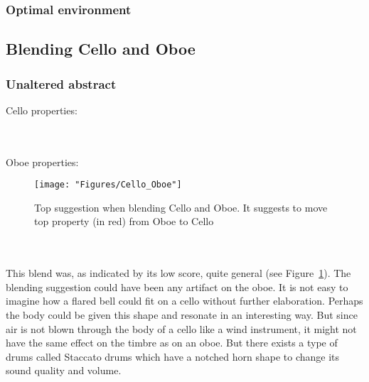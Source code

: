 \noindent{}


\subsubsection{Optimal environment}
\noindent\fbox{ \parbox{\textwidth}{
		
		
} }
\noindent\fbox{ \parbox{\textwidth}{
			
			
} }
		

\subsection{Blending Cello and Oboe}

\subsubsection{Unaltered abstract}

Cello properties:

\noindent{}
\\\\Oboe properties:

\begin{figure} \centering \texttt{[image: "Figures/Cello\_Oboe"]} \caption{Top suggestion when blending Cello and Oboe. It suggests to move top property (in red) from Oboe to Cello } \label{Cello-Oboe} \end{figure}

\noindent{}	
\\\\This blend was, as indicated by its low score, quite general (see Figure~\ref{Cello-Oboe}). The blending suggestion could have been any artifact on the oboe. It is not easy to imagine how a flared bell could fit on a cello without further elaboration. Perhaps the body could be given this shape and resonate in an interesting way. But since air is not blown through the body of a cello like a wind instrument, it might not have the same effect on the timbre as on an oboe. But there exists a type of drums called Staccato drums which have a notched horn shape to change its sound quality and volume.

